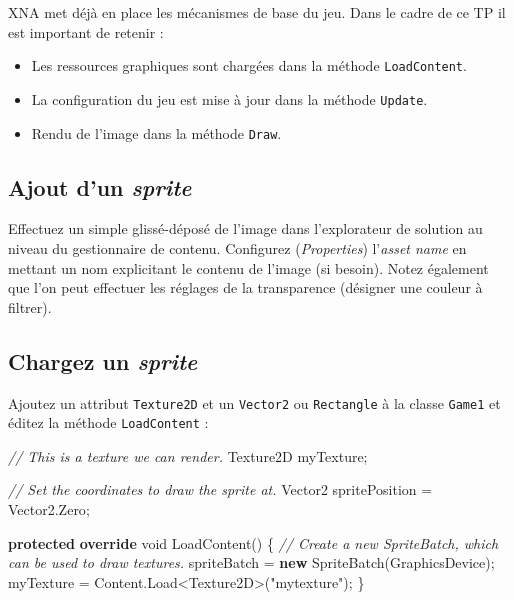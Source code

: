 \documentclass[11pt, a4paper]{article}
\newenvironment{Shaded}{}{}
\newcommand{\KeywordTok}[1]{\textcolor[rgb]{0.00,0.44,0.13}{\textbf{{#1}}}}
\newcommand{\DataTypeTok}[1]{\textcolor[rgb]{0.56,0.13,0.00}{{#1}}}
\newcommand{\StringTok}[1]{\textcolor[rgb]{0.25,0.44,0.63}{{#1}}}
\newcommand{\CommentTok}[1]{\textcolor[rgb]{0.38,0.63,0.69}{\textit{{#1}}}}
\newcommand{\FunctionTok}[1]{\textcolor[rgb]{0.02,0.16,0.49}{{#1}}}
\newcommand{\NormalTok}[1]{{#1}}
\begin{document}
XNA met déjà en place les mécanismes de base du jeu. Dans le cadre de ce
TP il est important de retenir :\newline

\begin{itemize}
\itemsep1pt\parskip0pt
\item
  Les ressources graphiques sont chargées dans la méthode
  \texttt{LoadContent}.
\item
  La configuration du jeu est mise à jour dans la méthode
  \texttt{Update}.
\item
  Rendu de l'image dans la méthode \texttt{Draw}.\newline
\end{itemize}

\subsection{Ajout d'un \emph{sprite}}\label{ajout-dun-sprite}

Effectuez un simple glissé-déposé de l'image dans l'explorateur de
solution au niveau du gestionnaire de contenu. Configurez
(\emph{Properties}) l'\emph{asset name} en mettant un nom explicitant le
contenu de l'image (si besoin). Notez également que l'on peut effectuer
les réglages de la transparence (désigner une couleur à filtrer).

\subsection{Chargez un \emph{sprite}}\label{chargez-un-sprite}

Ajoutez un attribut \texttt{Texture2D} et un \texttt{Vector2} ou
\texttt{Rectangle} à la classe \texttt{Game1} et éditez la méthode
\texttt{LoadContent} :

\begin{Shaded}
\begin{Highlighting}[]
\CommentTok{// This is a texture we can render.}
\NormalTok{Texture2D myTexture;}

\CommentTok{// Set the coordinates to draw the sprite at.}
\NormalTok{Vector2 spritePosition = Vector2.}\FunctionTok{Zero}\NormalTok{;}

\KeywordTok{protected} \KeywordTok{override} \DataTypeTok{void} \FunctionTok{LoadContent}\NormalTok{()}
\NormalTok{\{}
    \CommentTok{// Create a new SpriteBatch, which can be used to draw textures.}
    \NormalTok{spriteBatch = }\KeywordTok{new} \FunctionTok{SpriteBatch}\NormalTok{(GraphicsDevice);}
    \NormalTok{myTexture = Content.}\FunctionTok{Load}\NormalTok{<Texture2D>(}\StringTok{"mytexture"}\NormalTok{);}
\NormalTok{\}}
\end{Highlighting}
\end{Shaded}
\end{document}
